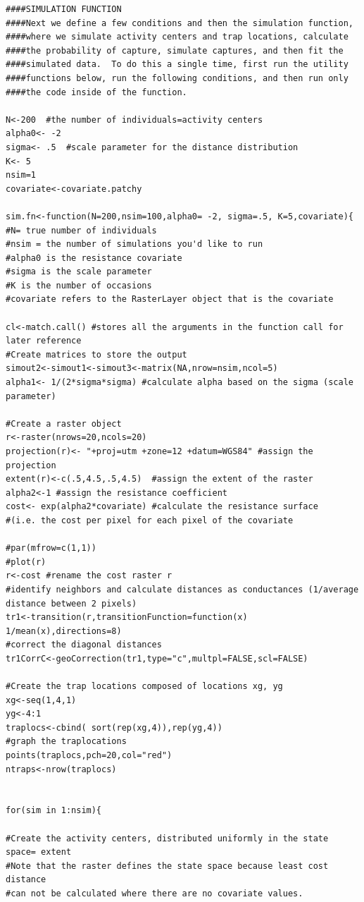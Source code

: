 \documentclass[12pt]{article}
\begin{document}
\begin{spacing}{1.2}
{\begin{verbatim}
####SIMULATION FUNCTION
####Next we define a few conditions and then the simulation function, 
####where we simulate activity centers and trap locations, calculate
####the probability of capture, simulate captures, and then fit the 
####simulated data.  To do this a single time, first run the utility
####functions below, run the following conditions, and then run only 
####the code inside of the function.

N<-200  #the number of individuals=activity centers
alpha0<- -2  
sigma<- .5  #scale parameter for the distance distribution
K<- 5
nsim=1
covariate<-covariate.patchy

sim.fn<-function(N=200,nsim=100,alpha0= -2, sigma=.5, K=5,covariate){
#N= true number of individuals
#nsim = the number of simulations you'd like to run
#alpha0 is the resistance covariate
#sigma is the scale parameter
#K is the number of occasions
#covariate refers to the RasterLayer object that is the covariate

cl<-match.call() #stores all the arguments in the function call for later reference
#Create matrices to store the output
simout2<-simout1<-simout3<-matrix(NA,nrow=nsim,ncol=5)
alpha1<- 1/(2*sigma*sigma) #calculate alpha based on the sigma (scale parameter)

#Create a raster object
r<-raster(nrows=20,ncols=20)
projection(r)<- "+proj=utm +zone=12 +datum=WGS84" #assign the projection
extent(r)<-c(.5,4.5,.5,4.5)  #assign the extent of the raster
alpha2<-1 #assign the resistance coefficient
cost<- exp(alpha2*covariate) #calculate the resistance surface 
#(i.e. the cost per pixel for each pixel of the covariate

#par(mfrow=c(1,1))
#plot(r)
r<-cost #rename the cost raster r
#identify neighbors and calculate distances as conductances (1/average distance between 2 pixels)
tr1<-transition(r,transitionFunction=function(x) 1/mean(x),directions=8)
#correct the diagonal distances 
tr1CorrC<-geoCorrection(tr1,type="c",multpl=FALSE,scl=FALSE) 

#Create the trap locations composed of locations xg, yg
xg<-seq(1,4,1)
yg<-4:1
traplocs<-cbind( sort(rep(xg,4)),rep(yg,4))
#graph the traplocations
points(traplocs,pch=20,col="red")
ntraps<-nrow(traplocs)


for(sim in 1:nsim){

#Create the activity centers, distributed uniformly in the state space= extent
#Note that the raster defines the state space because least cost distance 
#can not be calculated where there are no covariate values.


\end{verbatim}}
\end{spacing}
\end{document}

